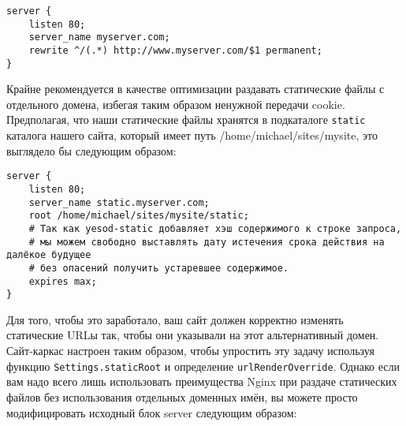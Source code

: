 \begin{lstlisting}
server {
    listen 80;
    server_name myserver.com;
    rewrite ^/(.*) http://www.myserver.com/$1 permanent;
}
\end{lstlisting}%
%
%

Крайне рекомендуется в качестве оптимизации раздавать статические файлы с отдельного домена, избегая таким образом ненужной передачи cookie. Предполагая, что наши статические файлы хранятся в подкаталоге \lstinline{static} каталога нашего сайта, который имеет путь /home/michael/sites/mysite, это выглядело бы следующим образом:

%
\begin{lstlisting}
server {
    listen 80;
    server_name static.myserver.com;
    root /home/michael/sites/mysite/static;
    # Так как yesod-static добавляет хэш содержимого к строке запроса,
    # мы можем свободно выставлять дату истечения срока действия на далёкое будущее
    # без опасений получить устаревшее содержимое.
    expires max;
}
\end{lstlisting}
%

Для того, чтобы это заработало, ваш сайт должен корректно изменять статические URLы так, чтобы они указывали на этот альтернативный домен. Сайт-каркас настроен таким образом, чтобы упростить эту задачу используя функцию \lstinline{Settings.staticRoot} и определение \lstinline{urlRenderOverride}. Однако если вам надо всего лишь использовать преимущества Nginx при раздаче статических файлов без использования отдельных доменных имён, вы можете просто модифицировать исходный блок server следующим образом:
%
%

